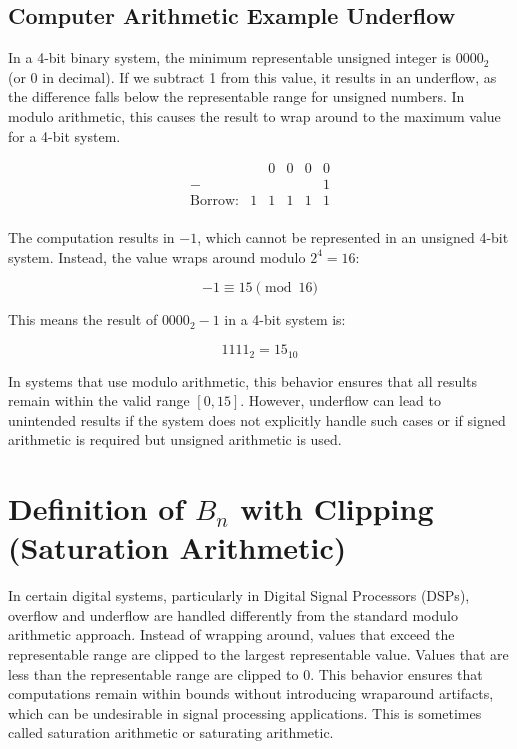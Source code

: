 \subsection{Computer Arithmetic Example Underflow} \label{subsub:underflow_example}
In a 4-bit binary system, the minimum representable unsigned integer is \( 0000_2 \) (or 0 in decimal). If we subtract 1 from this value, it results in an underflow, as the difference falls below the representable range for unsigned numbers. In modulo arithmetic, this causes the result to wrap around to the maximum value for a 4-bit system.

\[
\begin{array}{rccccc}
       &   & 0 & 0 & 0 & 0 \\ %
    -  &   &   &   &   & 1 \\ %
    \hline
\text{Borrow:} & 1 & 1 & 1 & 1 & 1 \\ %
\end{array}
\]

The computation results in \( -1 \), which cannot be represented in an unsigned 4-bit system. Instead, the value wraps around modulo \( 2^4 = 16 \):

\[
-1 \equiv 15 \pmod{16}
\]

This means the result of \( 0000_2 - 1 \) in a 4-bit system is:

\[
1111_2 = 15_{10}
\]

In systems that use modulo arithmetic, this behavior ensures that all results remain within the valid range \( [0, 15] \). However, underflow can lead to unintended results if the system does not explicitly handle such cases or if signed arithmetic is required but unsigned arithmetic is used.


\section{Definition of \( B_n \) with Clipping (Saturation Arithmetic)}
In certain digital systems, particularly in Digital Signal Processors (DSPs), overflow and underflow are handled differently from the standard modulo arithmetic approach. Instead of wrapping around, values that exceed the representable range are clipped to the largest representable value. Values that are less than the representable range are clipped to $0$. 
This behavior ensures that computations remain within bounds without introducing wraparound artifacts, which can be undesirable in signal processing applications. This is sometimes called saturation arithmetic or saturating arithmetic.

